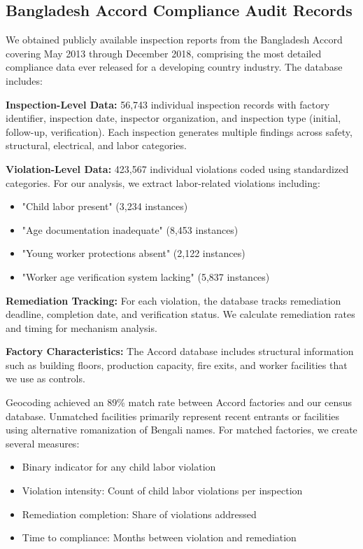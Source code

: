 \documentclass[12pt]{article}
\begin{document}
\subsection{Bangladesh Accord Compliance Audit Records}

We obtained publicly available inspection reports from the Bangladesh Accord covering May 2013 through December 2018, comprising the most detailed compliance data ever released for a developing country industry. The database includes:

\textbf{Inspection-Level Data:} 56,743 individual inspection records with factory identifier, inspection date, inspector organization, and inspection type (initial, follow-up, verification). Each inspection generates multiple findings across safety, structural, electrical, and labor categories.

\textbf{Violation-Level Data:} 423,567 individual violations coded using standardized categories. For our analysis, we extract labor-related violations including:
\begin{itemize}
\item "Child labor present" (3,234 instances)
\item "Age documentation inadequate" (8,453 instances)  
\item "Young worker protections absent" (2,122 instances)
\item "Worker age verification system lacking" (5,837 instances)
\end{itemize}

\textbf{Remediation Tracking:} For each violation, the database tracks remediation deadline, completion date, and verification status. We calculate remediation rates and timing for mechanism analysis.

\textbf{Factory Characteristics:} The Accord database includes structural information such as building floors, production capacity, fire exits, and worker facilities that we use as controls.

Geocoding achieved an 89\% match rate between Accord factories and our census database. Unmatched facilities primarily represent recent entrants or facilities using alternative romanization of Bengali names. For matched factories, we create several measures:

\begin{itemize}
\item Binary indicator for any child labor violation
\item Violation intensity: Count of child labor violations per inspection
\item Remediation completion: Share of violations addressed
\item Time to compliance: Months between violation and remediation
\end{itemize}
\end{document}
